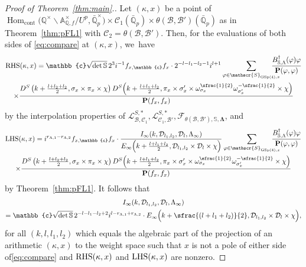 \documentclass[JEP,XML,SOM,Unicode,published]{cedram}
\newcommand{\psfrac}[2]{\sfrac{(#1)}{#2}}
\theoremstyle{plain}
\theoremstyle{remark}
\newcommand{\bA}{\mathbb{A}}
\newcommand{\bQ}{\mathbb{Q}}
\newcommand{\bS}{\mathbb{S}}
\newcommand{\bbc}{\mathbb{c}}
\newcommand{\cD}{\mathcal{D}}
\newcommand{\cF}{\mathcal{F}}
\newcommand{\cL}{\mathcal{L}}
\newcommand{\sB}{\mathscr{B}}
\newcommand{\sC}{\mathscr{C}}
\newcommand{\sS}{\mathscr{S}}
\newcommand{\bfP}{\mathbf{P}}
\DeclareMathOperator{\GSp}{GSp}
\newcommand{\cont}{\mathrm{cont}}
\DeclareMathOperator{\Hom}{Hom}
\let\bes B
\newcommand{\sLambda}{\scriptscriptstyle{\Lambda}}
\newcommand{\bLam}{\boldsymbol\Lambda}
\begin{document}
\begin{proof}[Proof of Theorem~\ref{thm:main}.]
Let $(\kappa,x)$ be a point of $\Hom_\cont\bigl(\bQ^\times\backslash\bA^\times_{\bQ,f}/U^p,\bar{\bQ}^\times_p \bigl)\times\sC_1(\bar{\bQ}_p)\times \theta(\sB,\sB')(\bar{\bQ}_p)$ as in Theorem~\ref{thm:pFL1} with $\sC_2=\theta(\sB,\sB')$. Then, for the evaluations of both sides of \eqref{eq:compare} at $(\kappa,x)$, we~have\vspace*{-5pt}
\begin{multline*}
\text{RHS}(\kappa,x)
=\bbc\sqrt{\det\bS}\,2^{3}i^{-1} f_{x,\bbc}f_x\cdot 2^{-l-l_1-l_2-1}i^{l+1}
\sum_{\varphi\in \sS_{\GSp(4),x}}\hspace*{-5mm}\frac{\bes^\dagger_{\bS,\Lambda}(\varphi)\varphi}{\bfP(\varphi,\varphi)} \\
\times\frac{D^S\left(k+\frac{l+l_2+l_2}{2},\sigma_x\times\pi_x\times\chi\right) D^S\Bigl(k+\frac{l+l_1+l_2}{2},\pi_x\times\sigma'_x\times\omega^{\sfrac{1}{2}}_{\sigma_x}\omega^{-\sfrac{1}{2}}_{\sigma'_x}\times\chi\Bigr)}{\bfP(f_x,f_x)}
\end{multline*}
by the interpolation properties of $\cL^{S,\ast}_{\sB,\sC_1},\cL^{S,\ast}_{\sC_1,\sB'}, \cF_{\theta(\sB,\sB'),\bS,\bLam}$, and\vspace*{-5pt}
\begin{multline*}
{\rm LHS}(\kappa,x)
= i^{r_{\sLambda,1}-r_{\sLambda,2}} f_{x,\bbc}f_x \cdot\frac{I_\infty(k,\cD_{l_1,l_2},\cD_l,\Lambda_\infty)}{E_\infty\Bigl(k+\frac{l+l_1+l_2}{2},\cD_{l_1,l_2}\times\cD_l\times\chi\Bigr)}\sum_{\varphi\in \sS_{\GSp(4),x}}\hspace*{-5mm}\frac{\bes^\dagger_{\bS,\Lambda}(\varphi)\varphi}{\bfP(\varphi,\varphi)} \\
\times\frac{D^S\left(k+\frac{l+l_2+l_2}{2},\sigma_x\times\pi_x\times\chi\right) D^S\Bigl(k+\frac{l+l_1+l_2}{2},\pi_x\times\sigma'_x\times\omega^{\sfrac{1}{2}}_{\sigma_x}\omega^{-\sfrac{1}{2}}_{\sigma'_x}\times\chi\Bigr)}{\bfP(f_x,f_x)}
\end{multline*}
by Theorem~\ref{thm:pFL1}. It follows that
\begin{multline}\label{eq:arch-zeta}
I_\infty(k,\cD_{l_1,l_2},\cD_l,\Lambda_\infty)\\
= \bbc\sqrt{\det\bS} \,2^{-l-l_1-l_2+2}i^{l-r_{\sLambda,1}+r_{\sLambda,2}} \cdot E_\infty\Bigl(k+\psfrac{l+l_1+l_2}{2},\cD_{l_1,l_2}\times\cD_l\times\chi\Bigr),
\end{multline}
for all $(k,l,l_1,l_2)$ which equals the algebraic part of the projection of an arithmetic $(\kappa,x)$ to the weight space such that $x$ is not a pole of either side of\eqref{eq:compare} and ${\rm RHS}(\kappa,x)$ and ${\rm LHS}(\kappa,x)$ are nonzero.


\end{proof}
\end{document}
